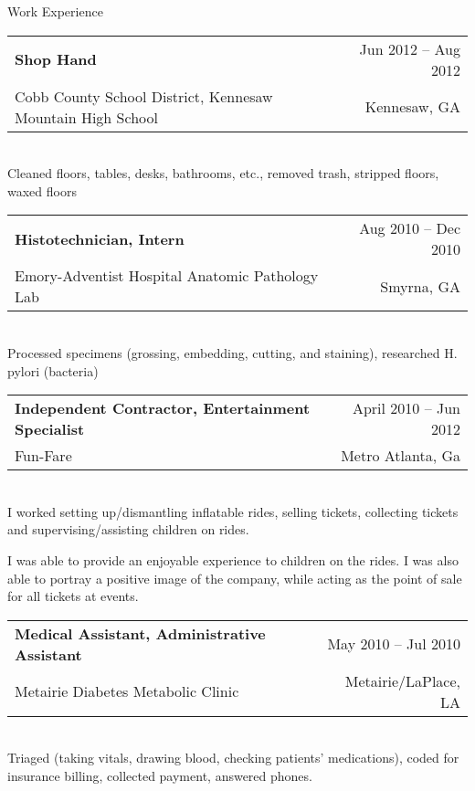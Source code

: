 \documentclass[10pt, letter]{article}
\makeatletter
\newenvironment{cvsection}[1]{
    {\Large #1}
    \vspace{.1cm}
    
}{
}
\newcommand{\cvitem}[6]{
    \strut\hfill\begin{minipage}{\dimexpr\textwidth-1cm}
    \begin{tabular*}{\linewidth}{@{}l@{\extracolsep{\fill}}r@{}}
        \textbf{#1} & #4 -- #5\\
        #2 & #3\\
    \end{tabular*}\\[.05cm]
    #6
    \end{minipage}
    \vspace{.3cm}
}
\makeatother
\begin{document}
\begin{cvsection}{Work Experience}
    \cvitem{Shop Hand}{Cobb County School District, Kennesaw Mountain High School}{Kennesaw, GA}{Jun 2012}{Aug 2012}{Cleaned floors, tables, desks, bathrooms, etc., removed trash, stripped floors, waxed floors}

    \cvitem{Histotechnician, Intern }{Emory-Adventist Hospital Anatomic Pathology Lab}{Smyrna, GA }{Aug 2010}{Dec 2010}{Processed specimens (grossing, embedding, cutting, and staining), researched H. pylori (bacteria) }

    \cvitem{Independent Contractor, Entertainment Specialist}{Fun-Fare}{Metro Atlanta, Ga}{April 2010}{Jun 2012}{I worked setting up/dismantling inflatable rides, selling tickets, collecting tickets and supervising/assisting children on rides. 

    I was able to provide an enjoyable experience to children on the rides. I was also able to portray a positive image of the company, while acting as the point of sale for all tickets at events.
    }

    \cvitem{Medical Assistant, Administrative Assistant}{Metairie Diabetes Metabolic Clinic}{Metairie/LaPlace, LA}{May 2010}{Jul 2010}{Triaged (taking vitals, drawing blood, checking patients’ medications), coded for insurance billing, collected payment, answered phones.}


\end{cvsection}
\end{document}
